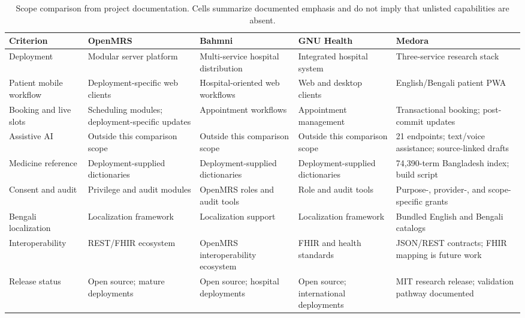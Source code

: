 \documentclass[preprint,12pt,a4paper]{elsarticle}
\newcommand{\tablerowsep}{\specialrule{0.25pt}{0.6pt}{0.6pt}}
\begin{document}
\begin{table}[!tb]
\scriptsize
\setlength{\tabcolsep}{3pt}
\begin{tabularx}{\textwidth}{@{}L{0.19\textwidth}YYYY@{}}
\toprule
\textbf{Criterion} & \textbf{OpenMRS}\cite{openmrs} & \textbf{Bahmni}\cite{bahmni} & \textbf{GNU Health}\cite{gnuhealth} & \textbf{Medora} \\
\midrule
Deployment & Modular server platform & Multi-service hospital distribution & Integrated hospital system & Three-service research stack \\
\tablerowsep
Patient mobile workflow & Deployment-specific web clients & Hospital-oriented web workflows & Web and desktop clients & English/Bengali patient PWA \\
\tablerowsep
Booking and live slots & Scheduling modules; deployment-specific updates & Appointment workflows & Appointment management & Transactional booking; post-commit updates \\
\tablerowsep
Assistive AI & Outside this comparison scope & Outside this comparison scope & Outside this comparison scope & 21 endpoints; text/voice assistance; source-linked drafts \\
\tablerowsep
Medicine reference & Deployment-supplied dictionaries & Deployment-supplied dictionaries & Deployment-supplied dictionaries & 74{,}390-term Bangladesh index; build script \\
\tablerowsep
Consent and audit & Privilege and audit modules & OpenMRS roles and audit tools & Role and audit tools & Purpose-, provider-, and scope-specific grants \\
\tablerowsep
Bengali localization & Localization framework & Localization support & Localization framework & Bundled English and Bengali catalogs \\
\tablerowsep
Interoperability & REST/FHIR ecosystem & OpenMRS interoperability ecosystem & FHIR and health standards & JSON/REST contracts; FHIR mapping is future work \\
\tablerowsep
Release status & Open source; mature deployments & Open source; hospital deployments & Open source; international deployments & MIT research release; validation pathway documented \\
\bottomrule
\end{tabularx}
\caption{Scope comparison from project documentation. Cells summarize documented emphasis and do not imply that unlisted capabilities are absent.}
\label{tab:related-work}
\end{table}
\end{document}
